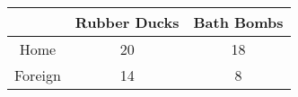 \begin{table}[ht]
    \centering
    \begin{tabular}{|c|c|c|}
    \hline
     & Rubber Ducks & Bath Bombs \\
    \hline
    Home & 20 & 18 \\
    \hline
    Foreign & 14 & 8 \\
    \hline
    \end{tabular}
\end{table}